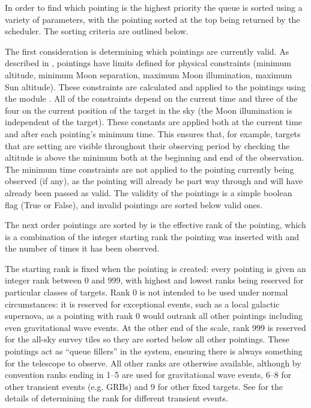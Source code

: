\begin{colsection}
\begin{colsection}
In order to find which pointing is the highest priority the queue is sorted using a variety of parameters, with the pointing sorted at the top being returned by the scheduler. The sorting criteria are outlined below.

\newpage

The first consideration is determining which pointings are currently valid. As described in , pointings have limits defined for physical constraints (minimum altitude, minimum Moon separation, maximum Moon illumination, maximum Sun altitude). These constraints are calculated and applied to the pointings using the   module \citep{astroplan}. All of the constraints depend on the current time and three of the four on the current position of the target in the sky (the Moon illumination is independent of the target). These constants are applied both at the current time and after each pointing's minimum time. This ensures that, for example, targets that are setting are visible throughout their observing period by checking the altitude is above the minimum both at the beginning and end of the observation. The minimum time constraints are not applied to the pointing currently being observed (if any), as the pointing will already be part way through and will have already been passed as valid. The validity of the pointings is a simple boolean flag (True or False), and invalid pointings are sorted below valid ones.

The next order pointings are sorted by is the effective rank of the pointing, which is a combination of the integer starting rank the pointing was inserted with and the number of times it has been observed.

The starting rank is fixed when the pointing is created: every pointing is given an integer rank between 0 and 999, with highest and lowest ranks being reserved for particular classes of targets. Rank 0 is not intended to be used under normal circumstances: it is reserved for exceptional events, such as a local galactic supernova, as a pointing with rank 0 would outrank all other pointings including even gravitational wave events. At the other end of the scale, rank 999 is reserved for the all-sky survey tiles so they are sorted below all other pointings. These pointings act as ``queue fillers'' in the system, ensuring there is always something for the telescope to observe. All other ranks are otherwise available, although by convention ranks ending in 1--5 are used for gravitational wave events, 6--8 for other transient events (e.g. GRBs) and 9 for other fixed targets. See  for the details of determining the rank for different transient events.


\end{colsection}
\end{colsection}
